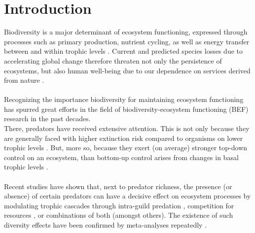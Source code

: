 \chapter{Introduction}
\label{chap:intro}
Biodiversity is a major determinant of ecosystem functioning, expressed through processes such as primary production, nutrient cycling, as well as energy transfer between and within trophic levels \citep[cf.][for review]{Tilman2014}. 
Current and predicted species losses due to accelerating global change \citep[e.g.][]{Ceballos2015, Urban2015} therefore threaten not only the persistence of ecosystems, but also human well-being due to our dependence on services derived from nature \citep{MEA2005,Cardinale2012}.
\\\\
Recognizing the importance biodiversity for maintaining ecosystem functioning has spurred great efforts in the field of biodiversity-ecosystem functioning (BEF) research in the past decades.\\
There, predators have received extensive attention. This is not only because they are generally faced with higher extinction risk compared to organisms on lower trophic levels  \citep{Dobson2006,Ripple2014}. But, more so, because they exert (on average) stronger top-down control on an ecosystem, than bottom-up control arises from changes in basal trophic levels \citep{Borer2006}.  \\\\
Recent studies have shown that, next to predator richness, the presence (or absence) of certain predators can have a decisive effect on ecosystem processes by modulating trophic cascades through intra-guild predation \citep{Finke2005,Wallach2015}, competition for resources  \citep{OConnor2008,Rodriguez-Lozano2015}, or combinations of both (amongst others). %
The existence of such diversity effects have been confirmed by meta-analyses repeatedly  \citep{Balvanera2006, Cardinale2006, Cardinale2012,Hooper2012}.\\\\ %
